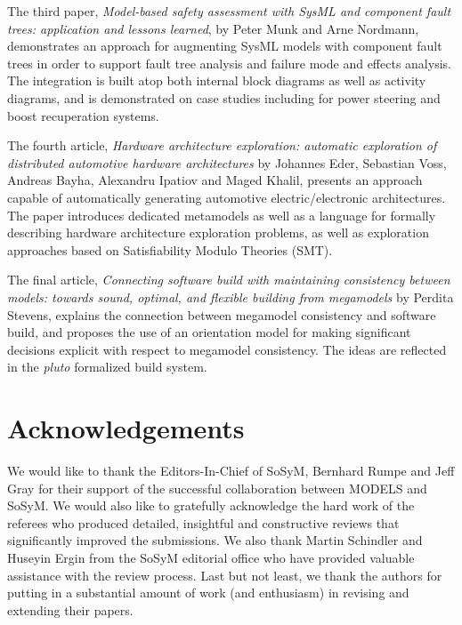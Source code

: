 \documentclass{svjour3}                     %
\begin{document}
The third paper, \textit{Model-based safety assessment with SysML and component fault trees: application and lessons learned}, by Peter Munk and
Arne Nordmann, demonstrates an approach for augmenting SysML models with component fault trees in order to support
fault tree analysis and failure mode and effects analysis. The integration is built atop both internal block diagrams as well as activity
diagrams, and is demonstrated on case studies including for power steering and boost recuperation systems.

The fourth article, \textit{Hardware architecture exploration: automatic exploration of distributed automotive hardware
architectures} by Johannes Eder, Sebastian Voss, Andreas Bayha, Alexandru Ipatiov and Maged Khalil, presents an approach capable of
automatically generating automotive electric/electronic architectures. The paper introduces dedicated metamodels as well as a language for formally
describing hardware architecture exploration problems, as well as exploration approaches based on Satisfiability Modulo Theories (SMT).

The final article, \textit{Connecting software build with maintaining consistency between models: towards sound, optimal, and flexible building from megamodels}
by Perdita Stevens, explains the connection between megamodel consistency and software build, and proposes the use of an orientation model for making
significant decisions explicit with respect to megamodel consistency. The ideas are reflected in the \textit{pluto} formalized build system.

\section*{Acknowledgements}
We would like to thank the Editors-In-Chief of SoSyM, Bernhard Rumpe and Jeff Gray for their support of the successful collaboration between MODELS and SoSyM.
We would also like to gratefully acknowledge the hard work of the referees who produced detailed, insightful and constructive reviews that significantly improved the
submissions. We also thank Martin Schindler and Huseyin Ergin from the SoSyM editorial office who have provided valuable assistance with the review process. Last but not least, we thank the authors for putting in a substantial amount of work (and enthusiasm) in revising and extending their papers.
\end{document}
